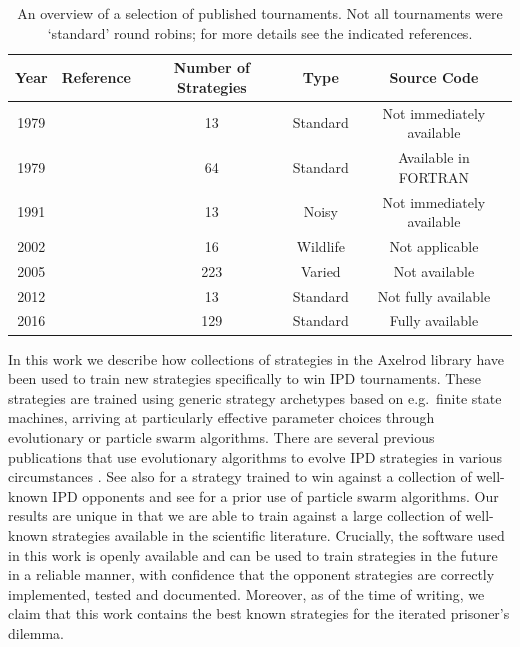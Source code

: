 \documentclass{article}
\begin{document}
\begin{table}[!hbtp]
    \begin{center}
        \begin{tabular}{ccccc}
            \toprule
            Year     & Reference                  & Number of Strategies & Type     & Source Code\\
            \midrule
            1979     & \cite{Axelrod1980a}        & 13                   & Standard & Not immediately available\\
            1979     & \cite{Axelrod1980b}        & 64                   & Standard & Available in FORTRAN\\
            1991     & \cite{Bendor1991}          & 13                   & Noisy    & Not immediately available\\
            2002     & \cite{Stephens2002}        & 16                   & Wildlife & Not applicable\\
            2005     & \cite{kendall2007iterated} & 223                  & Varied   & Not available \\
            2012     & \cite{Stewart2012}         & 13                   & Standard & Not fully available \\
            2016     & \cite{knight2016open}       & 129                  & Standard & Fully available \\
            \bottomrule
        \end{tabular}
    \end{center}
    \caption{An overview of a selection of published tournaments. Not all
             tournaments were `standard' round robins; for more details
             see the indicated references.}\label{tbl:tournaments}
\end{table}

In this work we describe how collections of strategies in the Axelrod library
have been used to train new strategies specifically to win IPD tournaments.
These strategies are trained using generic strategy archetypes based on e.g.\
finite state
machines, arriving at particularly effective parameter choices through
evolutionary or particle swarm algorithms. There are several
previous publications that use evolutionary algorithms to
evolve IPD strategies in various circumstances
\cite{ashlock2006training, Ashlock2015, Ashlock2006,
      ashlock2014shaped, Ashlock2014, barlow2015varying,
      fogel1993evolving, marks1989niche, sudo2015effects,
      vassiliades2010multiagent}. See also \cite{Gaudesi2016} for a
strategy trained to win against a collection of well-known IPD opponents and see
\cite{franken2005particle} for a prior use of particle swarm algorithms. Our
results are unique in that we are able to train against a large collection of
well-known strategies available in the scientific literature. Crucially, the
software used in this work is openly available and can be used to train strategies
in the future in a reliable manner, with confidence that the opponent strategies
are correctly implemented, tested and documented.
Moreover, as of the time of writing,
we claim that this work contains the best known strategies for the iterated
prisoner's dilemma.
\end{document}
